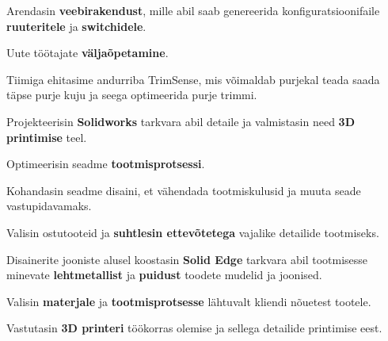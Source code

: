 \documentclass[letterpaper]{deedy-resume} %
\begin{document}
\begin{minipage}[t]{0.66\textwidth}
\sectionspace %


\begin{tightitemize}
  \item Arendasin \textbf{veebirakendust}, mille abil saab genereerida konfiguratsioonifaile \textbf{ruuteritele} ja \textbf{switchidele}.
  \item Uute töötajate \textbf{väljaõpetamine}.
\end{tightitemize}

\sectionspace %



\begin{tightitemize}
  \item Tiimiga ehitasime andurriba TrimSense, mis võimaldab purjekal teada saada täpse purje kuju ja seega optimeerida purje trimmi.
  \item Projekteerisin \textbf{Solidworks} tarkvara abil detaile ja valmistasin need \textbf{3D printimise} teel.
  \item Optimeerisin seadme \textbf{tootmisprotsessi}.
  \item Kohandasin seadme disaini, et vähendada tootmiskulusid ja muuta seade vastupidavamaks.
  \item Valisin ostutooteid ja \textbf{suhtlesin ettevõtetega} vajalike detailide tootmiseks.
\end{tightitemize}

\sectionspace %




\begin{tightitemize}
  \item Disainerite jooniste alusel koostasin \textbf{Solid Edge} tarkvara abil tootmisesse minevate \textbf{lehtmetallist} ja \textbf{puidust} toodete mudelid ja joonised.
  \item Valisin \textbf{materjale} ja \textbf{tootmisprotsesse} lähtuvalt kliendi nõuetest tootele.
  \item Vastutasin \textbf{3D printeri} töökorras olemise ja sellega detailide printimise eest.
\end{tightitemize}


\end{minipage}
\end{document}

